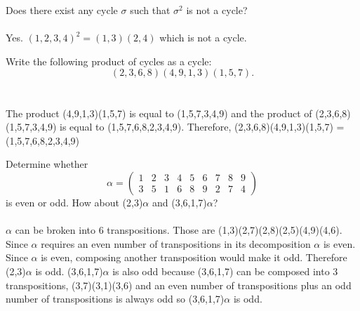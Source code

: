 \documentclass[titlepage]{article}
\newenvironment{problem}[2][Problem]{\begin{trivlist}
\item[\hskip \labelsep {\bfseries #1}\hskip \labelsep {\bfseries #2.}]}{\end{trivlist}}
\begin{document}
 
\fancyhf{}
\cfoot{\thepage}

\begin{problem}{1}
Does there exist any cycle $\sigma$ such that $\sigma^2$ is not a cycle?
\\ \\
Yes. $(1,2,3,4)^{2} = (1,3)(2,4)$ which is not a cycle.
\end{problem}

\begin{problem}{2}
Write the following product of cycles as a cycle:
$$(2,3,6,8)(4,9,1,3)(1,5,7).$$
\\ \\
The product (4,9,1,3)(1,5,7) is equal to (1,5,7,3,4,9) and the product of  (2,3,6,8)(1,5,7,3,4,9) is equal to (1,5,7,6,8,2,3,4,9). Therefore, (2,3,6,8)(4,9,1,3)(1,5,7) = (1,5,7,6,8,2,3,4,9)
\end{problem}

\begin{problem}{3}
Determine whether 
$$\alpha = \left(\begin{array}{ccccccccc} 1 & 2 & 3 & 4 & 5 & 6 & 7 & 8 & 9 \\ 3 & 5 & 1 & 6 & 8 & 9 & 2 & 7 & 4 \end{array}\right)$$
is even or odd. How about (2,3)$\alpha$ and (3,6,1,7)$\alpha$?
\\ \\
$\alpha$ can be broken into 6 transpositions. Those are (1,3)(2,7)(2,8)(2,5)(4,9)(4,6). Since $\alpha$ requires an even number of transpositions in its decomposition $\alpha$ is even. Since $\alpha$ is even, composing another transposition would make it odd. Therefore (2,3)$\alpha$ is odd. (3,6,1,7)$\alpha$ is also odd because (3,6,1,7) can be composed into 3 transpositions, (3,7)(3,1)(3,6) and an even number of transpositions plus an odd number of transpositions is always odd so (3,6,1,7)$\alpha$ is odd.
\end{problem}
\end{document}
